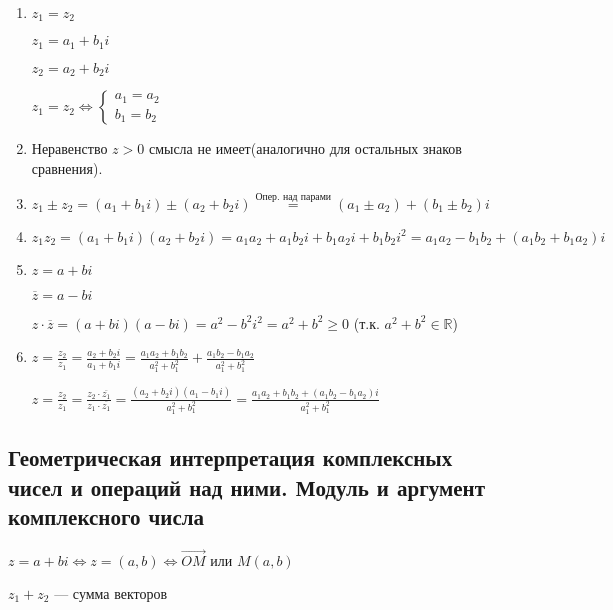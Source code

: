 \documentclass{article}
\begin{document}
    \begin{enumerate}    
        \item \(z_1 = z_2\)
        
        \( z_1 = a_1 + b_{1}i \)
        
        \( z_2 = a_2 + b_{2}i \)

        \( z_1 = z_2 \Leftrightarrow \begin{cases}
            a_1 = a_2\\
            b_1 = b_2
        \end{cases} \)
            
        \item Неравенство \(z > 0\) смысла не имеет(аналогично для остальных знаков сравнения).
        \item \( z_1 \pm z_2 = (a_1 + b_1i) \pm (a_2 + b_2i) \stackrel{\textrm{Опер. над парами}}{=} (a_1 \pm a_2) + (b_1 \pm b_2)i \)
        \item \(z_1z_2 = (a_1+b_1i)(a_2+b_2i) = a_1a_2+a_1b_2i + b_1a_2i + b_1b_2i^2 = a_1a_2-b_1b_2+(a_1b_2+b_1a_2)i\)
        \item 
        
        \( z = a+bi\)
        
        \( \overline{z} = a - bi\)

        \(z\cdot \overline{z} = (a+bi)(a-bi) = a^2 - b^2i^2= a^2+b^2 \geq 0\) (т.к. \(a^2 + b^2 \in \mathbb{R}\))
        
        \item \(z = \frac{z_2}{z_1} = \frac{a_2+b_2i}{a_1+b_1i} = \frac{a_1a_2+b_1b_2}{a_1^2+b_1^2} + \frac{a_1b_2-b_1a_2}{a_1^2+b_1^2}\)
        
        \(z = \frac{z_2}{z_1} = \frac{z_2\cdot \overline{z_1}}{z_1\cdot \overline{z_1}} = \frac{(a_2+b_2i)(a_1-b_1i)}{a_1^2+b_1^2} = \frac{a_1a_2 + b_1b_2 + (a_1b_2 - b_1a_2)i}{a_1^2 + b_1^2}\)
    \end{enumerate}

    \subsection{Геометрическая интерпретация комплексных чисел и операций над ними. Модуль и аргумент комплексного числа}

    \( z = a + bi \Leftrightarrow z = (a, b) \Leftrightarrow \overrightarrow{OM} \textrm{ или } M(a, b) \)

    
    \( z_1 + z_2 \) --- сумма векторов
\end{document}
